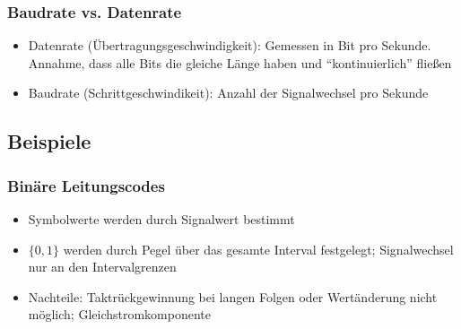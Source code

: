 \subsubsection{Baudrate vs. Datenrate}
\begin{itemize}
	\item Datenrate (Übertragungsgeschwindigkeit): Gemessen in Bit pro Sekunde. Annahme, dass alle Bits die gleiche Länge haben und "`kontinuierlich"' fließen
	\item Baudrate (Schrittgeschwindikeit): Anzahl der Signalwechsel pro Sekunde
\end{itemize}


\subsection{Beispiele}

\subsubsection{Binäre Leitungscodes}
\begin{itemize}
	\item Symbolwerte werden durch Signalwert bestimmt
	\item \(\{0,1\}\) werden durch Pegel über das gesamte Interval festgelegt; Signalwechsel nur an den Intervalgrenzen
	\item Nachteile: Taktrückgewinnung bei langen Folgen oder Wertänderung nicht möglich; Gleichstromkomponente
\end{itemize}

